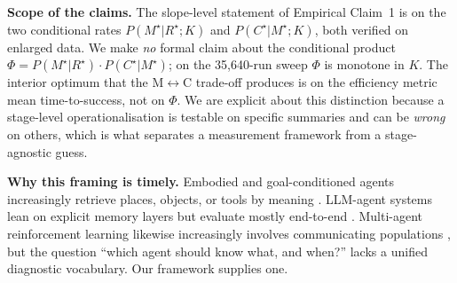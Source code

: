 \documentclass{article}
\begin{document}
\textbf{Scope of the claims.} The slope-level statement of Empirical Claim~1 is on the two conditional rates $P(M^\star|R^\star;K)$ and $P(C^\star|M^\star;K)$, both verified on enlarged data. We make \emph{no} formal claim about the conditional product $\Phi = P(M^\star|R^\star)\!\cdot\!P(C^\star|M^\star)$; on the 35{,}640-run sweep $\Phi$ is monotone in $K$. The interior optimum that the M$\leftrightarrow$C trade-off produces is on the efficiency metric mean time-to-success, not on $\Phi$. We are explicit about this distinction because a stage-level operationalisation is testable on specific summaries and can be \emph{wrong} on others, which is what separates a measurement framework from a stage-agnostic guess.

\textbf{Why this framing is timely.} Embodied and goal-conditioned
agents increasingly retrieve places, objects, or tools by meaning
\citep{andrychowicz2017hindsight,ghosh2021learning,savva2019habitat}.
LLM-agent systems lean on explicit memory layers but evaluate mostly
end-to-end \citep{wang2023voyager,shinn2023reflexion,packer2023memgpt}.
Multi-agent reinforcement learning likewise increasingly involves
communicating populations \citep{lowe2017maddpg,foerster2018ctde}, but
the question ``which agent should know what, and when?'' lacks a
unified diagnostic vocabulary. Our framework supplies one.
\end{document}
